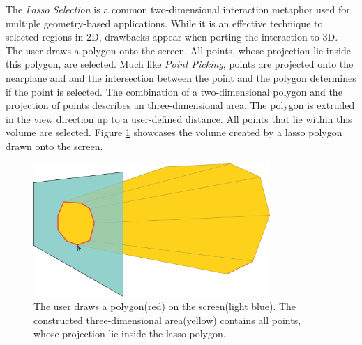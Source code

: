 The \textit{Lasso Selection} is a common two-dimensional interaction metaphor used for multiple geometry-based applications. While it is an effective technique to selected regions in 2D, drawbacks appear when porting the interaction to 3D. The user draws a polygon onto the screen. All points, whose projection lie inside this polygon, are selected. Much like \textit{Point Picking}, points are projected onto the nearplane and and the intersection between the point and the polygon determines if the point is selected. The combination of a two-dimensional polygon and the projection of points describes an three-dimensional area. The polygon is extruded in the view direction up to a user-defined distance. All points that lie within this volume are selected. Figure \ref{fig:lasso_sketch} showcases the volume created by a lasso polygon drawn onto the screen.


\begin{figure}
	\centering
	\includegraphics[width=0.8\textwidth]{Interactions/lasso_sketch.png}%
	\caption{The user draws a polygon(red) on the screen(light blue). The constructed three-dimensional area(yellow) contains all points, whose projection lie inside the lasso polygon. }
	\label{fig:lasso_sketch}
\end{figure}


